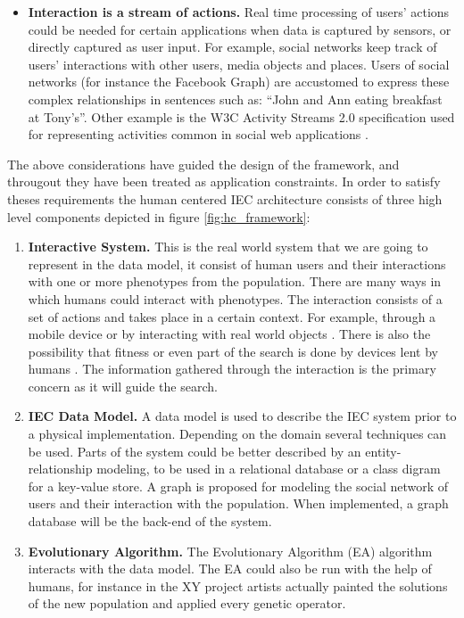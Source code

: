 \begin{itemize}
\item {\bf Interaction is a stream of actions.}
  Real time processing of users' actions could be needed for certain applications when data is 
  captured by sensors, or directly captured as user input. For example, social networks keep
  track of users' interactions with other users, media objects and places. Users of 
  social networks (for instance the Facebook Graph) are accustomed to express these 
  complex relationships in sentences such as: ``John and Ann eating breakfast at Tony's''. 
  Other example is the W3C Activity Streams 2.0 specification used for representing activities 
  common in social web applications \cite{json:streams}. 
\end{itemize}

The above considerations have guided the design of the framework, and througout they have been
treated as application constraints. In order to satisfy theses requirements the
human centered IEC architecture consists of three high level components depicted
in figure \ref{fig:hc_framework}:

\begin{enumerate}
  \item {\bf Interactive System.} 
  This is the real world system that we are going to represent in the data model, 
  it consist of human users and their interactions with one or more phenotypes
  from the population. There are many ways in which humans could interact 
  with phenotypes. The interaction consists of a set of actions and 
  takes place in a certain context. For example, through a mobile device  
  or by interacting with real world objects 
  \cite{de2014artists,de2013unplugging}. 
  There is also the possibility that fitness or even part of the search 
  is done by devices lent by humans \cite{DBLP:conf/gecco/MereloCGCRV16}.
  The information gathered through the interaction is the primary concern
  as it will guide the search. 

  \item {\bf IEC Data Model.}
  A data model is used to describe the IEC system prior to a physical 
  implementation.  Depending on the domain several techniques can be used.
  Parts of the system could be better described by an entity-relationship 
  modeling, to be used in a relational database or a class digram for a 
  key-value store. A graph is proposed for modeling the social network of users 
  and their interaction with the population. When implemented, a graph database 
  will be the back-end of the system. 

  \item {\bf Evolutionary Algorithm.} 
  The Evolutionary Algorithm (EA) algorithm interacts with the data model. The EA could also be run with the help of
  humans, for instance in the XY project \cite{de2013unplugging} artists actually painted
  the solutions of the new population and applied every genetic operator.
\end{enumerate}

